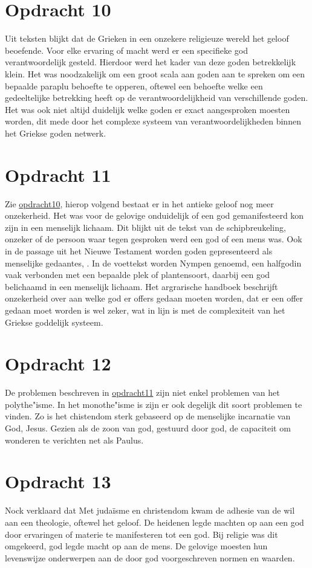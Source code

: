 \documentclass[10pt]{amsart}
\begin{document}
\section*{Opdracht 10}
\label{opdracht10}
Uit teksten blijkt dat de Grieken in een onzekere religieuze wereld het geloof beoefende. Voor elke ervaring of macht werd er een specifieke god verantwoordelijk gesteld. Hierdoor werd het kader van deze goden betrekkelijk klein. Het was noodzakelijk om een groot scala aan goden aan te spreken om een bepaalde paraplu behoefte te opperen, oftewel een behoefte welke een gedeeltelijke betrekking heeft op de verantwoordelijkheid van verschillende goden. Het was ook niet altijd duidelijk welke goden er exact aangesproken moesten worden, dit mede door het complexe systeem van verantwoordelijkheden binnen het Griekse goden netwerk. 

\section*{Opdracht 11}
\label{opdracht11}
Zie \hyperref[Opdracht 10]{opdracht10}, hierop volgend bestaat er in het antieke geloof nog meer onzekerheid. Het was voor de gelovige onduidelijk of een god gemanifesteerd kon zijn in een menselijk lichaam. Dit blijkt uit de tekst van de schipbreukeling, onzeker of de persoon waar tegen gesproken werd een god of een mens was. Ook in de passage uit het Nieuwe Testament worden goden gepresenteerd als menselijke gedaantes, . In de voettekst worden Nympen genoemd, een halfgodin vaak verbonden met een bepaalde plek of plantensoort, daarbij een god belichaamd in een menselijk lichaam. Het argrarische handboek beschrijft onzekerheid over aan welke god er offers gedaan moeten worden, dat er een offer gedaan moet worden is wel zeker, wat in lijn is met de complexiteit van het Griekse goddelijk systeem.

\section*{Opdracht 12}
De problemen beschreven in \hyperref[Opdracht 11]{opdracht11} zijn niet enkel problemen van het polythe"isme. In het monothe"isme is zijn er ook degelijk dit soort problemen te vinden. Zo is het chistendom sterk gebaseerd op de menselijke incarnatie van God, Jesus. Gezien als de zoon van god, gestuurd door god, de capaciteit om wonderen te verichten net als Paulus.


\section*{Opdracht 13}   
Nock verklaard dat Met judaïsme en christendom kwam de adhesie van de wil aan een theologie, oftewel het geloof.\autocite{nockConversionOldNew1933} De heidenen legde machten op aan een god door ervaringen of materie te manifesteren tot een god. Bij religie was dit omgekeerd, god legde macht op aan de mens. De gelovige moesten hun levenswijze onderwerpen aan de door god voorgeschreven normen en waarden. 
\end{document}
